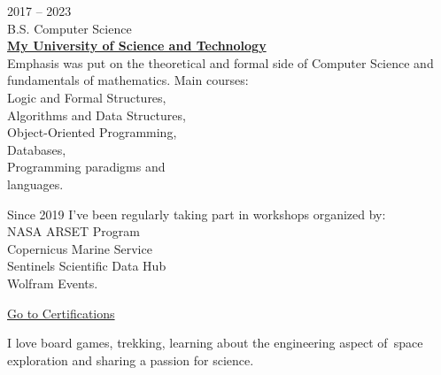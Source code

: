 
{\small 2017 -- 2023\\
B.S. Computer Science\\
{\textbf{{\href{https://www.google.com/}{My University of Science and Technology}}}}}\\
Emphasis was put on the theoretical and formal side of Computer Science and fundamentals of mathematics. Main courses:\\
\task Logic and Formal Structures,\\
\task Algorithms and Data Structures,\\
\task Object-Oriented Programming,\\ \task Databases,\\
\task Programming paradigms and\\ languages.

\vspace{8pt}

Since 2019 I've been regularly taking part in workshops
organized by:\\
\task NASA ARSET Program\\
\task Copernicus Marine Service\\
\task Sentinels Scientific Data Hub\\
\task Wolfram Events.

\hfill \href{https://www.google.com/}{\ssmall Go to Certifications \faLink}


I love board games, trekking, learning about the engineering aspect of~space exploration and sharing a passion for science.
